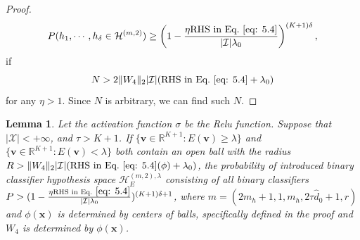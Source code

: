 \documentclass{article}
\theoremstyle{plain}
\newtheorem{lemma}[theorem]{Lemma}
\theoremstyle{definition}
\theoremstyle{remark}
\begin{document}
\begin{proof}
    \begin{equation}
        P(h_1,\cdots,h_{\delta}\in \mathcal{H}^{(m,2)})\geq \left(1-\frac{\eta \text{RHS~in~Eq.}~\eqref{eq: 5.4}}{|\mathcal{I}|\lambda_0}\right)^{(K+1)\delta},
    \end{equation} 
    if
   \begin{equation}
        N>2\|W_4\|_2|\mathcal{I}|(\text{RHS~in~Eq.}~\eqref{eq: 5.4}+\lambda_0)
    \end{equation}
    for any $\eta>1$.
    Since $N$ is arbitrary, we can find such $N$.
\end{proof}


\begin{lemma}
    Let the activation function $\sigma$ be the Relu function. Suppose that $|\mathcal{X}| < +\infty$, and $\tau>K+1$. 
    If $\{\mathbf{v}\in \mathbb{R}^{K+1}: E(\mathbf{v})\geq \lambda\}$ and $\{\mathbf{v}\in \mathbb{R}^{K+1}: E(\mathbf{v})< \lambda\}$ both contain an open ball with the radius $R>\|W_4\|_2|\mathcal{I}|(\text{RHS~in~Eq.}~\eqref{eq: 5.4}(\phi)+\lambda_0)$, the probability of introduced binary classifier hypothesis space $\mathcal{H}_{ E}^{(m,2),\lambda}$ consisting of all binary classifiers $P>(1-\frac{\eta \text{RHS~in~Eq.}~\eqref{eq: 5.4}}{|\mathcal{I}|\lambda_0})^{(K+1)\delta+1}$, where $m=(2m_h+1,1,m_h,2\tau \hat{d}_0+1,r)$ and $\phi(\mathbf{x})$ is determined by centers of balls, specifically defined in the proof and $W_4$ is determined by $\phi(\mathbf{x})$.
    \label{Lemma 6}
\end{lemma}
\end{document}
